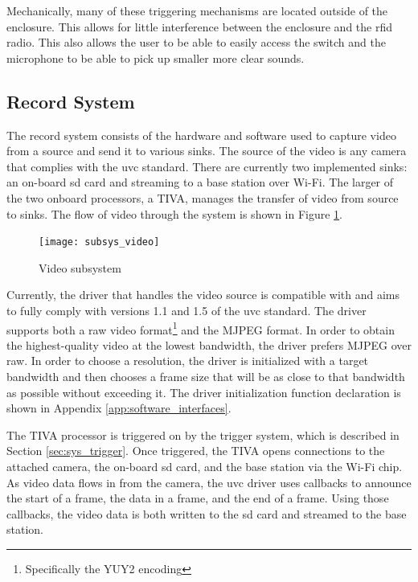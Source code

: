 \documentclass[12pt]{article}
\begin{document}
Mechanically, many of these triggering mechanisms are located outside of the
enclosure. This allows for little interference between the enclosure and the
\gls{rfid} radio. This also allows the user to be able to easily access the
switch and the microphone to be able to pick up smaller more clear sounds.

\subsection{Record System}
\label{sec:sys_video}
The record system consists of the hardware and software used to capture video
from a source and send it to various sinks. The source of the video is any
camera that complies with the \gls{uvc} standard. There are currently two
implemented sinks: an on-board \gls{sd} card and streaming to a base station
over Wi-Fi. The larger of the two onboard processors, a TIVA, manages the
transfer of video from source to sinks. The flow of video through the system is
shown in Figure \ref{fig:video_flow}.

\begin{figure}[h]
    \centering
    \texttt{[image: subsys\_video]}
    \caption{Video subsystem}
    \label{fig:video_flow}
\end{figure}

Currently, the driver that handles the video source is compatible with and aims
to fully comply with versions 1.1 and 1.5 of the \gls{uvc}
standard\cite{uvc_standard_11,uvc_standard_15}. The driver supports both a raw
video format\footnote{Specifically the YUY2 encoding} and the MJPEG format. In
order to obtain the highest-quality video at the lowest bandwidth, the driver
prefers MJPEG over raw. In order to choose a resolution, the driver is
initialized with a target bandwidth and then chooses a frame size that will be
as close to that bandwidth as possible without exceeding it. The driver
initialization function declaration is shown in Appendix
\ref{app:software_interfaces}.

The TIVA processor is triggered on by the trigger system, which is described in
Section \ref{sec:sys_trigger}. Once triggered, the TIVA opens connections to
the attached camera, the on-board \gls{sd} card, and the base station via the
Wi-Fi chip. As video data flows in from the camera, the \gls{uvc} driver uses
callbacks to announce the start of a frame, the data in a frame, and the
end of a frame. Using those callbacks, the video data is both written to the
\gls{sd} card and streamed to the base station.
\end{document}
